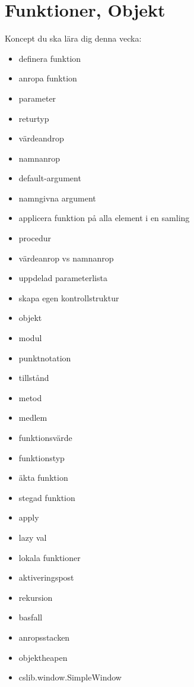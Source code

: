 \chapter{Funktioner, Objekt}\label{chapter:W03}
Koncept du ska lära dig denna vecka:
\begin{multicols}{2}\begin{itemize}[nosep,label={$\square$},leftmargin=*]
\item definera funktion
\item anropa funktion
\item parameter
\item returtyp
\item värdeandrop
\item namnanrop
\item default-argument
\item namngivna argument
\item applicera funktion på alla element i en samling
\item procedur
\item värdeanrop vs namnanrop
\item uppdelad parameterlista
\item skapa egen kontrollstruktur
\item objekt
\item modul
\item punktnotation
\item tillstånd
\item metod
\item medlem
\item funktionsvärde
\item funktionstyp
\item äkta funktion
\item stegad funktion
\item apply
\item lazy val
\item lokala funktioner
\item aktiveringspost
\item rekursion
\item basfall
\item anropsstacken
\item objektheapen
\item cslib.window.SimpleWindow\end{itemize}\end{multicols}
